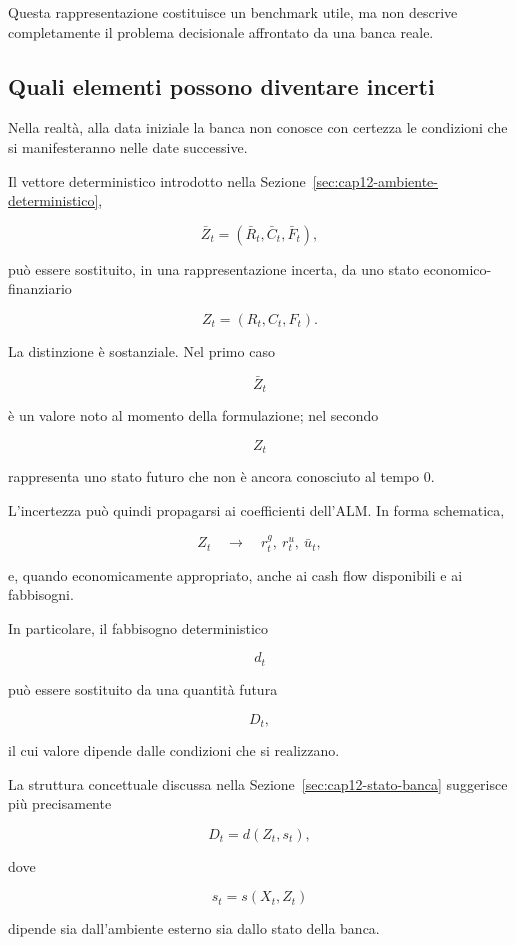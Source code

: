 Questa rappresentazione costituisce un benchmark utile, ma non descrive
completamente il problema decisionale affrontato da una banca reale.

\subsection{Quali elementi possono diventare incerti}

Nella realt\`a, alla data iniziale la banca non conosce con certezza le
condizioni che si manifesteranno nelle date successive.

Il vettore deterministico introdotto nella
Sezione~\ref{sec:cap12-ambiente-deterministico},

\[
\bar Z_t
=
(\bar R_t,\bar C_t,\bar F_t),
\]

\noindent pu\`o essere sostituito, in una rappresentazione incerta, da uno stato
economico-finanziario

\[
Z_t
=
(R_t,C_t,F_t).
\]

La distinzione \`e sostanziale. Nel primo caso

\[
\bar Z_t
\]

\noindent \`e un valore noto al momento della formulazione; nel secondo

\[
Z_t
\]

\noindent rappresenta uno stato futuro che non \`e ancora conosciuto al tempo $0$.

L'incertezza pu\`o quindi propagarsi ai coefficienti dell'ALM. In forma
schematica,

\[
Z_t
\quad\longrightarrow\quad
r^g_t,\ r^u_t,\ \bar u_t,
\]

\noindent e, quando economicamente appropriato, anche ai cash flow disponibili e ai
fabbisogni.

In particolare, il fabbisogno deterministico

\[
d_t
\]

\noindent pu\`o essere sostituito da una quantit\`a futura

\[
D_t,
\]

\noindent il cui valore dipende dalle condizioni che si realizzano.

La struttura concettuale discussa nella
Sezione~\ref{sec:cap12-stato-banca} suggerisce pi\`u precisamente

\[
D_t
=
d(Z_t,s_t),
\]

\noindent dove

\[
s_t
=
s(X_t,Z_t)
\]

\noindent dipende sia dall'ambiente esterno sia dallo stato della banca.

